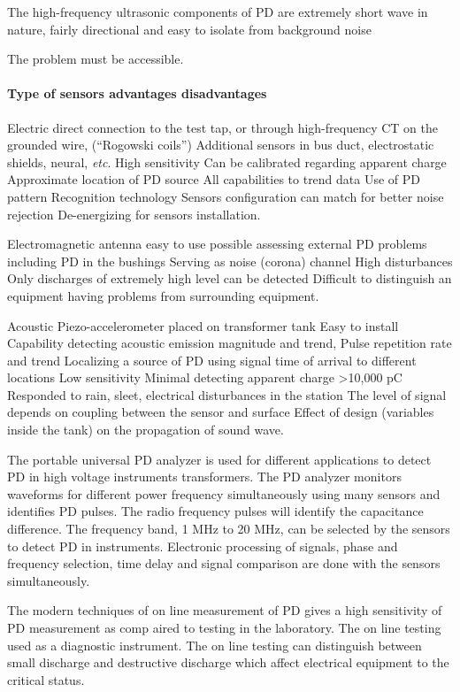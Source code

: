 The high-frequency ultrasonic components of PD are extremely short wave in nature, fairly directional and easy to isolate from background noise

The problem must be accessible.

\paragraph{Type of sensors advantages disadvantages\\}\setlength{\parskip}{1em}Electric direct connection to the test tap, or through high-frequency CT on the grounded wire, (\textquotedblleft Rogowski coils\textquotedblright) Additional sensors in bus duct, electrostatic shields, neural, \textit{etc}. High sensitivity Can be calibrated regarding apparent charge Approximate location of PD source All capabilities to trend data Use of PD pattern Recognition technology Sensors configuration can match for better noise rejection De-energizing for sensors installation.

Electromagnetic antenna easy to use possible assessing external PD problems including PD in the bushings Serving as noise (corona) channel High disturbances Only discharges of extremely high level can be detected Difficult to distinguish an equipment having problems from surrounding equipment.

Acoustic Piezo-accelerometer placed on transformer tank Easy to install Capability detecting acoustic emission magnitude and trend, Pulse repetition rate and trend Localizing a source of PD using signal time of arrival to different locations Low sensitivity Minimal detecting apparent charge \textgreater 10,000 pC Responded to rain, sleet, electrical disturbances in the station The level of signal depends on coupling between the sensor and surface Effect of design (variables inside the tank) on the propagation of sound wave.

The portable universal PD analyzer is used for different applications to detect PD in high voltage instruments transformers. The PD analyzer monitors waveforms for different power frequency simultaneously using many sensors and identifies PD pulses. The radio frequency pulses will identify the capacitance difference. The frequency band, 1 MHz to 20 MHz, can be selected by the sensors to detect PD in instruments. Electronic processing of signals, phase and frequency selection, time delay and signal comparison are done with the sensors simultaneously.

The modern techniques of on line measurement of PD gives a high sensitivity of PD measurement as comp aired to testing in the laboratory. The on line testing used as a diagnostic instrument. The on line testing can distinguish between small discharge and destructive discharge which affect electrical equipment to the critical status\setlength{\parskip}{0em}.

